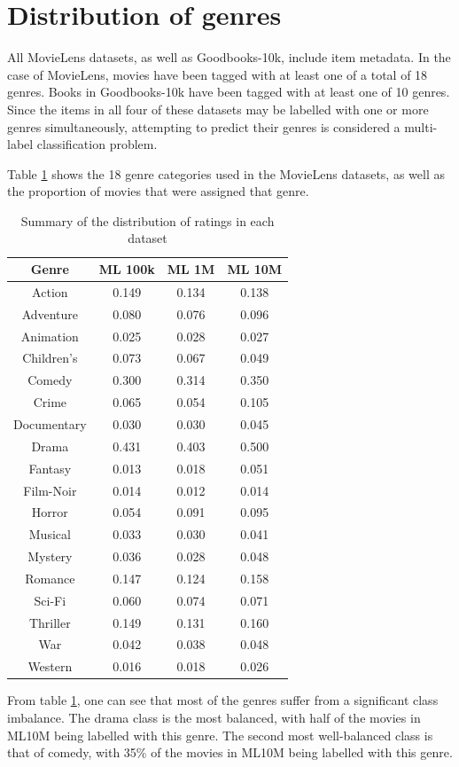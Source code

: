 \section{Distribution of genres}
All MovieLens datasets, as well as Goodbooks-10k, include item metadata. In the case of MovieLens, movies have been tagged with at least one of a total of 18 genres. Books in Goodbooks-10k have been tagged with at least one of 10 genres. Since the items in all four of these datasets may be labelled with one or more genres simultaneously, attempting to predict their genres is considered a multi-label classification problem.

Table \ref{tab:ML-genres} shows the 18 genre categories used in the MovieLens datasets, as well as the proportion of movies that were assigned that genre.

\begin{table}[H]
\centering
\begin{tabular}{c | c | c | c}
\toprule
\textbf{Genre} & \textbf{ML 100k} & \textbf{ML 1M} & \textbf{ML 10M} \\
\midrule
Action & 0.149 & 0.134 & 0.138 \\
Adventure & 0.080 & 0.076 & 0.096 \\
Animation & 0.025 & 0.028 & 0.027 \\
Children's & 0.073 & 0.067 & 0.049 \\
Comedy & 0.300 & 0.314 & 0.350 \\
Crime & 0.065 & 0.054 & 0.105 \\
Documentary & 0.030 & 0.030 & 0.045 \\
Drama & 0.431 & 0.403 & 0.500 \\
Fantasy & 0.013 & 0.018 & 0.051 \\
Film-Noir & 0.014 & 0.012 & 0.014 \\
Horror & 0.054 & 0.091 & 0.095 \\
Musical & 0.033 & 0.030 & 0.041 \\
Mystery & 0.036 & 0.028 & 0.048 \\
Romance & 0.147 & 0.124 & 0.158 \\
Sci-Fi & 0.060 & 0.074 & 0.071 \\
Thriller & 0.149 & 0.131 & 0.160 \\
War & 0.042 & 0.038 & 0.048 \\
Western & 0.016 & 0.018 & 0.026 \\
\bottomrule
\end{tabular}
\caption[Movies per genre as a proportion of the total]{Summary of the distribution of ratings in each dataset}
\label{tab:ML-genres}
\end{table}

From table \ref{tab:ML-genres}, one can see that most of the genres suffer from a significant class imbalance. The drama class is the most balanced, with half of the movies in ML10M being labelled with this genre. The second most well-balanced class is that of comedy, with 35\% of the movies in ML10M being labelled with this genre.